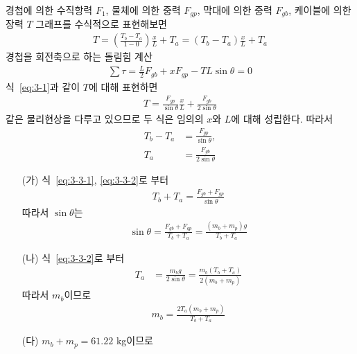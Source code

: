 \documentclass[floatfix,nofootinbib,superscriptaddress,fleqn]{revtex4-2}
\begin{document}
경첩에 의한 수직항력 $F_1$, 물체에 의한 중력 $F_{gp}$, 막대에 의한 중력 $F_{gb}$,
케이블에 의한 장력 $T$
그래프를 수식적으로 표현해보면
\begin{align}\label{eq:3-1}
  T = \left(\frac{T_b - T_a}{1-0}\right)\frac{x}{L}+T_a
  =\left(T_b - T_a\right)\frac{x}{L}+T_a
\end{align}
경첩을 회전축으로 하는 돌림힘 계산
\begin{align}\label{eq:3-2}
  \sum \tau = \frac{L}{2}F_{gb} + xF_{gp}-TL\sin\theta=0
\end{align}
식~\eqref{eq:3-1}과 같이 $T$에 대해 표현하면
\begin{align}
  T = \frac{F_{gp}}{\sin\theta}\frac{x}{L}+\frac{F_{gb}}{2\sin\theta}
\end{align}
같은 물리현상을 다루고 있으므로 두 식은 임의의 $x$와 $L$에 대해 성립한다. 따라서
\begin{align}
  \label{eq:3-3-1}T_b - T_a &= \frac{F_{gp}}{\sin\theta},  \\
  \label{eq:3-3-2}T_a &= \frac{F_{gb}}{2\sin\theta}
\end{align}
\begin{itemize}
  \item[(가)]
  식~\eqref{eq:3-3-1}, \eqref{eq:3-3-2}로 부터
  \begin{align}
    T_b+T_a = \frac{F_{gb}+F_{gp}}{\sin\theta}
  \end{align}
  따라서 $\sin\theta$는
  \begin{align}
    \sin\theta = \frac{F_{gb}+F_{gp}}{T_b+T_a}
    =\frac{(m_b+m_p)g}{T_b+T_a}
  \end{align}
  \item[(나)] 
    식~\eqref{eq:3-3-2}로 부터
    \begin{align}
      T_a &= \frac{m_{b}g}{2\sin\theta}
      = \frac{m_{b}(T_b+T_a)}{2(m_b+m_p)}
    \end{align}
    따라서 $m_b$이므로
    \begin{align}
      m_b = \frac{2T_a(m_b+m_p)}{T_b+T_a}
    \end{align}
  \item[(다)]
  $m_b+m_p=61.22$ kg이므로
\end{itemize}

\vspace{1.cm}
\end{document}
